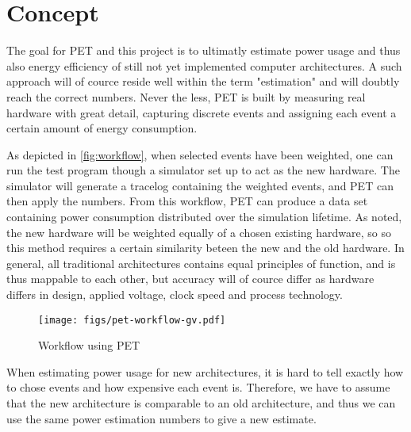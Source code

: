 \section{Concept}
The goal for PET and this project is to ultimatly estimate power usage and thus
also energy efficiency of still not yet implemented computer architectures. A
such approach will of cource reside well within the term "estimation" and will
doubtly reach the correct numbers. Never the less, PET is built by measuring
real hardware with great detail, capturing discrete events and assigning each
event a certain amount of energy consumption.

As depicted in \autoref{fig:workflow}, when selected events have been weighted,
one can run the test program though a simulator set up to act as the new
hardware.  The simulator will generate a tracelog containing the weighted
events, and PET can then apply the numbers. From this workflow, PET can produce
a data set containing power consumption distributed over the simulation
lifetime.  As noted, the new hardware will be weighted equally of a chosen
existing hardware, so so this method requires a certain similarity beteen the
new and the old hardware. In general, all traditional architectures contains
equal principles of function, and is thus mappable to each other, but accuracy
will of cource differ as hardware differs in design, applied voltage, clock
speed and process technology.

\begin{figure}
    \texttt{[image: figs/pet-workflow-gv.pdf]}
    \caption{Workflow using PET}
    \label{fig:workflow}
\end{figure}

When estimating power usage for new architectures, it is hard to tell exactly
how to chose events and how expensive each event is. Therefore, we have to
assume that the new architecture is comparable to an old architecture, and thus
we can use the same power estimation numbers to give a new estimate.

